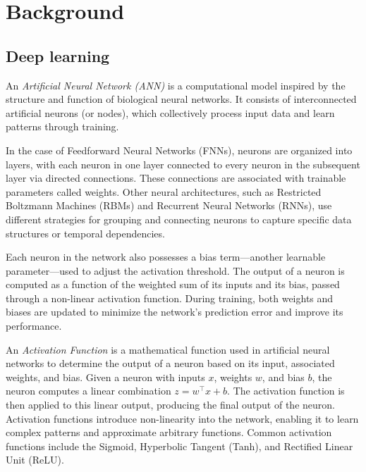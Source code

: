 \chapter{Background}
\label{cha:Background}

\section{Deep learning}

\begin{definition}
  An \textit{Artificial Neural Network (ANN)} \autocite{oshea2015introductionconvolutionalneuralnetworks} \autocite{sharma2017activation} is a computational model inspired by the structure and function of biological neural networks. It consists of interconnected artificial neurons (or nodes), which collectively process input data and learn patterns through training.

  In the case of Feedforward Neural Networks (FNNs), neurons are organized into layers, with each neuron in one layer connected to every neuron in the subsequent layer via directed connections. These connections are associated with trainable parameters called weights. Other neural architectures, such as Restricted Boltzmann Machines (RBMs) and Recurrent Neural Networks (RNNs), use different strategies for grouping and connecting neurons to capture specific data structures or temporal dependencies.

  Each neuron in the network also possesses a bias term—another learnable parameter—used to adjust the activation threshold. The output of a neuron is computed as a function of the weighted sum of its inputs and its bias, passed through a non-linear activation function. During training, both weights and biases are updated to minimize the network’s prediction error and improve its performance.
\end{definition}

\begin{definition}
  An \textit{Activation Function} \autocite{sharma2017activation} is a mathematical function used in artificial neural networks to determine the output of a neuron based on its input, associated weights, and bias. Given a neuron with inputs \(x\), weights \(w\), and bias \(b\), the neuron computes a linear combination \(z = w^\top x + b\). The activation function is then applied to this linear output, producing the final output of the neuron. Activation functions introduce non-linearity into the network, enabling it to learn complex patterns and approximate arbitrary functions. Common activation functions include the Sigmoid, Hyperbolic Tangent (Tanh), and Rectified Linear Unit (ReLU).
\end{definition}

